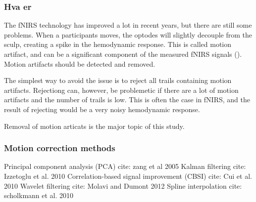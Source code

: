 \subsubsection{Hva er}
The fNIRS technology has improved a lot in recent years, but there are still some problems. When a participants moves, the optodes will slightly decouple from the sculp, creating a spike in the hemodynamic response. This is called motion artifact, and can be a significant component of the measured fNIRS signals (). Motion artifacts should be detected and removed.

The simplest way to avoid the issue is to reject all trails containing motion artifacts. Rejectiong can, however, be problemetic if there are a lot of motion artifacts and the number of trails is low. This is often the case in fNIRS, and the result of rejecting would be a very noisy hemodynamic response.

Removal of motion articats is the major topic of this study.

\subsubsection{Motion correction methods}

Principal component analysis (PCA) cite: zang et al 2005
Kalman filtering cite: Izzetoglu et al. 2010
Correlation-based signal improvement (CBSI) cite: Cui et al. 2010
Wavelet filtering cite: Molavi and Dumont 2012
Spline interpolation cite: scholkmann et al. 2010






